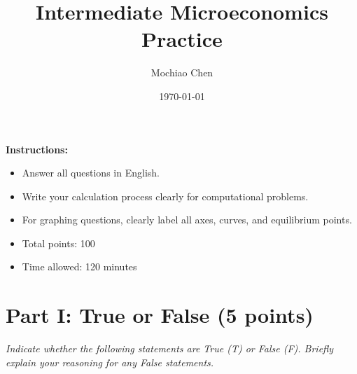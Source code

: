 \documentclass[12pt, a4paper]{article}
\title{\textbf{Intermediate Microeconomics Practice }}
\author{Mochiao Chen}
\date{\today}
\begin{document}
\maketitle
\noindent \textbf{Instructions:}
\begin{itemize}
    \item Answer all questions in English.
    \item Write your calculation process clearly for computational problems.
    \item For graphing questions, clearly label all axes, curves, and equilibrium points.
    \item Total points: 100
    \item Time allowed: 120 minutes
\end{itemize}

\section*{Part I: True or False (5 points)}
\textit{Indicate whether the following statements are True (T) or False (F). Briefly explain your reasoning for any False statements.}
\end{document}
